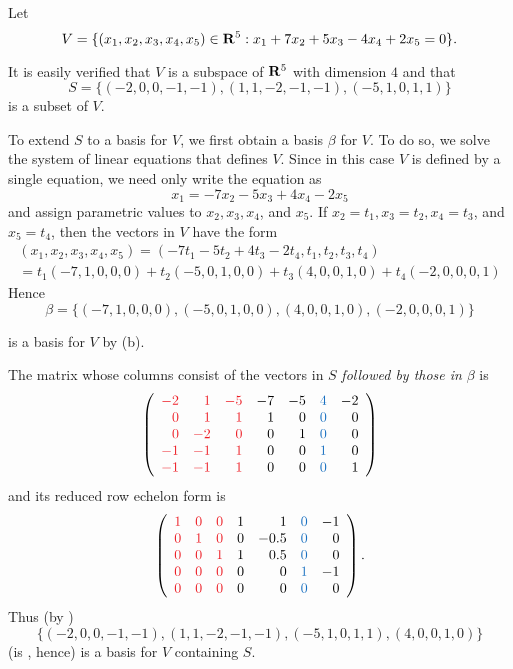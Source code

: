 \begin{example} \label{example 3.4.4}
Let
\[
    V = \{
        (x_1, x_2, x_3, x_4, x_5) \in \mathbf{R}^5
        : x_1 + 7x_2 + 5x_3 - 4x_4 + 2x_5 = 0
    \}.
\]

It is easily verified that \(V\) is a subspace of \(\mathbf{R}^{5}\) with dimension \(4\) and that
\[
    S = \{(-2,0,0,-1,-1),(1,1,-2,-1,-1),(-5,1,0,1,1)\}
\]
is a \LID{} subset of \(V\).

To extend \(S\) to a basis for \(V\), we first obtain a basis  \(\beta\) for \(V\).
To do so, we solve the system of linear equations that defines \(V\).
Since in this case \(V\) is defined by a single equation, we need only write the equation as
\[
    x_1 = -7 x_2 - 5 x_3 + 4 x_4 - 2 x_5
\]
and assign parametric values to \(x_2, x_3, x_4\), and \(x_5\).
If \(x_2 = t_1, x_3 = t_2, x_4 = t_3\), and \(x_5 = t_4\), then the vectors in \(V\) have the form
\[
\begin{array}{l}
    (x_1, x_2, x_3, x_4, x_5) = (-7 t_1 - 5 t_2 + 4 t_3 - 2 t_4, t_1, t_2, t_3, t_4) \\
    = t_1(-7,1,0,0,0) + t_2(-5,0,1,0,0) + t_3(4,0,0,1,0) + t_4(-2,0,0,0,1)
\end{array}
\]
Hence
\[
    \beta = \{(-7,1,0,0,0),(-5,0,1,0,0),(4,0,0,1,0),(-2,0,0,0,1)\}
\]

is a basis for \(V\) by (b).

The matrix whose columns consist of the vectors in \(S\) \emph{followed by those in} \(\beta\) is
\[
    \left(\begin{array}{rrrrrrr}
        \RED{-2} & \RED{1}  & \RED{-5} & -7 & -5 & \BLUE{4} & -2 \\
        \RED{0}  & \RED{1}  & \RED{1}  &  1 &  0 & \BLUE{0} & 0 \\
        \RED{0}  & \RED{-2} & \RED{0}  &  0 &  1 & \BLUE{0} & 0 \\
        \RED{-1} & \RED{-1} & \RED{1}  &  0 &  0 & \BLUE{1} & 0 \\
        \RED{-1} & \RED{-1} & \RED{1}  &  0 &  0 & \BLUE{0} & 1
    \end{array}\right)
\]
and its reduced row echelon form is
\[
    \left(\begin{array}{llllrlr}
        \RED{1} & \RED{0} & \RED{0} & 1 &    1 & \BLUE{0} & -1 \\
        \RED{0} & \RED{1} & \RED{0} & 0 & -0.5 & \BLUE{0} & 0 \\
        \RED{0} & \RED{0} & \RED{1} & 1 &  0.5 & \BLUE{0} & 0 \\
        \RED{0} & \RED{0} & \RED{0} & 0 &    0 & \BLUE{1} & -1 \\
        \RED{0} & \RED{0} & \RED{0} & 0 &    0 & \BLUE{0} & 0
\end{array}\right).
\]
Thus (by )
\[
    \{(-2,0,0,-1,-1),(1,1,-2,-1,-1),(-5,1,0,1,1),(4,0,0,1,0)\}
\]
(is \LID{}, hence) is a basis for \(V\) containing \(S\).
\end{example}
